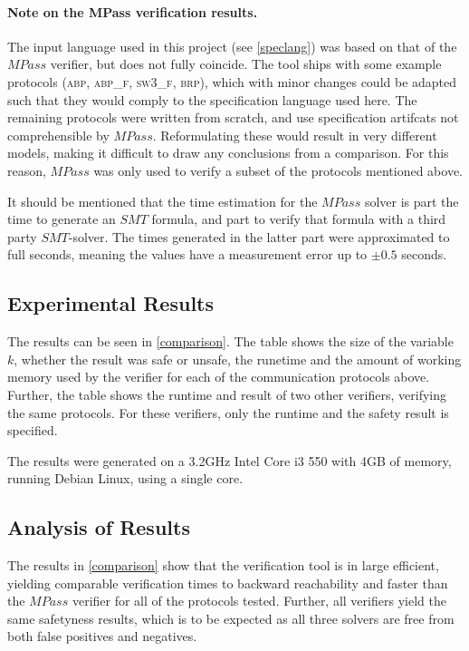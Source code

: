 \paragraph{Note on the MPass verification results.}
The input language used in this project (see \ref{speclang}) was based on that of the $MPass$ verifier, but does not fully coincide. The tool ships with some example protocols (\textsc{abp, abp\_f, sw3\_f, brp}), which with minor changes could be adapted such that they would comply to the specification language used here. The remaining protocols were written from scratch, and use specification artifcats not comprehensible by $MPass$. Reformulating these would result in very different models, making it difficult to draw any conclusions from a comparison. For this reason, $MPass$ was only used to verify a subset of the protocols mentioned above.

It should be mentioned that the time estimation for the $MPass$ solver is part the time to generate an $SMT$ formula, and part to verify that formula with a third party $SMT$-solver. The times generated in the latter part were approximated to full seconds, meaning the values have a measurement error up to $\pm 0.5$ seconds.

\subsection{Experimental Results}
The results can be seen in \ref{comparison}. The table shows the size of the variable $k$, whether the result was safe or unsafe, the runetime and the amount of working memory used by the verifier for each of the communication protocols above. Further, the table shows the runtime and result of two other verifiers, verifying the same protocols. For these verifiers, only the runtime and the safety result is specified.

The results were generated on a 3.2GHz Intel Core i3 550 with 4GB of memory, running Debian Linux, using a single core.

\subsection{Analysis of Results}
The results in \ref{comparison} show that the verification tool is in large efficient, yielding comparable verification times to backward reachability and faster than the $MPass$ verifier for all of the protocols tested. Further, all verifiers yield the same safetyness results, which is to be expected as all three solvers are free from both false positives and negatives.

